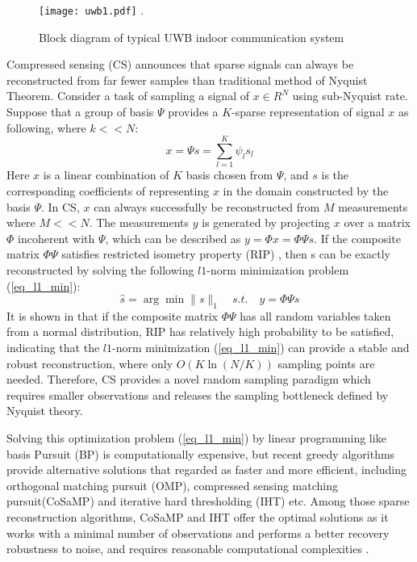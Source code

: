 \begin{figure}[!t]
\centering
\texttt{[image: uwb1.pdf]}
\DeclareGraphicsExtensions.
\caption{Block diagram of typical UWB indoor communication system}
\label{uwb1}
\end{figure}

Compressed sensing (CS) announces that sparse signals can always be reconstructed from far fewer samples than traditional method of Nyquist Theorem. Consider a task of sampling a signal of $x \in R^N$ using sub-Nyquist rate. Suppose that a group of basis $\Psi$ provides a $K$-sparse representation of signal $x$ as following,  where $k << N$:  
\begin{equation}
\label{eq_sparse}
x=\Psi s=\sum_{l=1}^{K}\psi_l s_l  
\end{equation}
Here $x$ is a linear combination of $K$ basis chosen from $\Psi$, and $s$ is the corresponding coefficients of representing $x$ in the domain constructed by the basis $\Psi$. In CS, $x$  can always successfully be reconstructed from $M$ measurements where $M << N$. The measurements $y$ is generated by projecting $x$ over a matrix $\Phi$ incoherent with $\Psi$, which can be described as $y = \Phi x = \Phi \Psi s$. If the composite matrix $\Phi \Psi$ satisfies restricted isometry property (RIP) \cite{candes2006robust}, then s can be exactly reconstructed by solving the following $l1$-norm minimization problem (\ref{eq_l1_min}):
\begin{equation}
\label{eq_l1_min}
\hat s = \arg\min \| s \|_1 \quad s.t. \quad  y = \Phi \Psi s
\end{equation}
It is shown in \cite{baraniuk2007compressive} that if the composite matrix $\Phi \Psi$ has all random variables taken from a normal distribution, RIP has relatively high probability to be satisfied, indicating that the $l1$-norm minimization (\ref{eq_l1_min}) can provide a stable and robust reconstruction, where only $O(K\ln(N/K))$ sampling points are needed. Therefore, CS provides a novel random sampling paradigm which requires smaller observations and releases the sampling bottleneck defined by Nyquist theory.

Solving this optimization problem (\ref{eq_l1_min}) by linear programming like basis Pursuit (BP) is computationally expensive, but recent greedy algorithms provide alternative solutions that regarded as faster and more efficient, including orthogonal matching pursuit (OMP), compressed sensing matching pursuit(CoSaMP) and iterative hard thresholding (IHT) etc. Among those sparse reconstruction algorithms, CoSaMP and IHT offer the optimal solutions as it works with a minimal number of observations and performs a better recovery robustness to noise, and requires reasonable computational complexities \cite{needell2009cosamp}.

